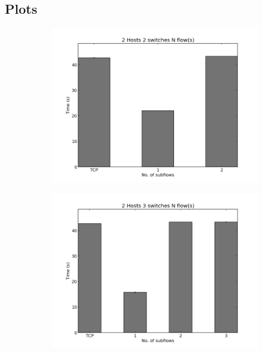 \documentclass[10pt]{report}
\begin{document}
\begin{appendices}
  \chapter{Plots}
  \label{sec:app}

  \begin{figure}[hb]
    \centering
    \begin{subfigure}[b]{0.49\textwidth}
      \includegraphics[width=\textwidth]{images/hist_sw2.png}
    \end{subfigure}
    \begin{subfigure}[b]{0.5\textwidth}
      \includegraphics[width=\textwidth]{images/hist_sw3.png}
    \end{subfigure}

\end{figure}
\end{appendices}
\end{document}

